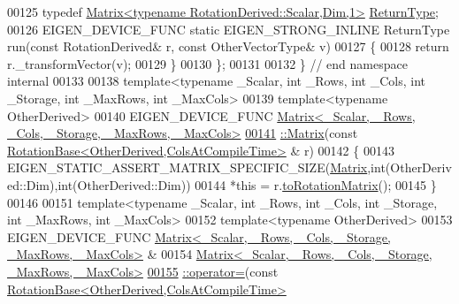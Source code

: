 \begin{DoxyCode}
00125   \textcolor{keyword}{typedef} \hyperlink{group___core___module_class_eigen_1_1_matrix}{Matrix<typename RotationDerived::Scalar,Dim,1>} 
      \hyperlink{group___core___module_class_eigen_1_1_matrix}{ReturnType};
00126   EIGEN\_DEVICE\_FUNC \textcolor{keyword}{static} EIGEN\_STRONG\_INLINE ReturnType run(\textcolor{keyword}{const} RotationDerived& r, \textcolor{keyword}{const} 
      OtherVectorType& v)
00127   \{
00128     \textcolor{keywordflow}{return} r.\_transformVector(v);
00129   \}
00130 \};
00131 
00132 \} \textcolor{comment}{// end namespace internal}
00133 
00138 \textcolor{keyword}{template}<\textcolor{keyword}{typename} \_Scalar, \textcolor{keywordtype}{int} \_Rows, \textcolor{keywordtype}{int} \_Cols, \textcolor{keywordtype}{int} \_Storage, \textcolor{keywordtype}{int} \_MaxRows, \textcolor{keywordtype}{int} \_MaxCols>
00139 \textcolor{keyword}{template}<\textcolor{keyword}{typename} OtherDerived>
00140 EIGEN\_DEVICE\_FUNC \hyperlink{group___core___module_a11f852d66fa55b2aed12aa22da807a6b}{Matrix<\_Scalar, \_Rows, \_Cols, \_Storage, \_MaxRows, \_MaxCols>}
\hyperlink{group___core___module_ae714ec2f92b13d808c336faf185e5893}{00141} \hyperlink{group___core___module_a11f852d66fa55b2aed12aa22da807a6b}{::Matrix}(\textcolor{keyword}{const} \hyperlink{class_eigen_1_1_rotation_base}{RotationBase<OtherDerived,ColsAtCompileTime>}
      & r)
00142 \{
00143   EIGEN\_STATIC\_ASSERT\_MATRIX\_SPECIFIC\_SIZE(\hyperlink{group___core___module_class_eigen_1_1_matrix}{Matrix},\textcolor{keywordtype}{int}(OtherDerived::Dim),\textcolor{keywordtype}{int}(OtherDerived::Dim))
00144   *\textcolor{keyword}{this} = r.\hyperlink{class_eigen_1_1_rotation_base_aac726e89402a427c605514ce31b01e42}{toRotationMatrix}();
00145 \}
00146 
00151 \textcolor{keyword}{template}<\textcolor{keyword}{typename} \_Scalar, \textcolor{keywordtype}{int} \_Rows, \textcolor{keywordtype}{int} \_Cols, \textcolor{keywordtype}{int} \_Storage, \textcolor{keywordtype}{int} \_MaxRows, \textcolor{keywordtype}{int} \_MaxCols>
00152 \textcolor{keyword}{template}<\textcolor{keyword}{typename} OtherDerived>
00153 EIGEN\_DEVICE\_FUNC \hyperlink{group___core___module_class_eigen_1_1_matrix}{Matrix<\_Scalar, \_Rows, \_Cols, \_Storage, \_MaxRows, \_MaxCols>}
      &
00154 \hyperlink{group___core___module_aa123b56b10819a0cbf5164abb242102f}{Matrix<\_Scalar, \_Rows, \_Cols, \_Storage, \_MaxRows, \_MaxCols>}
\hyperlink{group___core___module_aeb446fe4b77c1c7c0538641d3cca6235}{00155} \hyperlink{group___core___module_aa123b56b10819a0cbf5164abb242102f}{::operator=}(\textcolor{keyword}{const} \hyperlink{class_eigen_1_1_rotation_base}{RotationBase<OtherDerived,ColsAtCompileTime>}

\end{DoxyCode}
